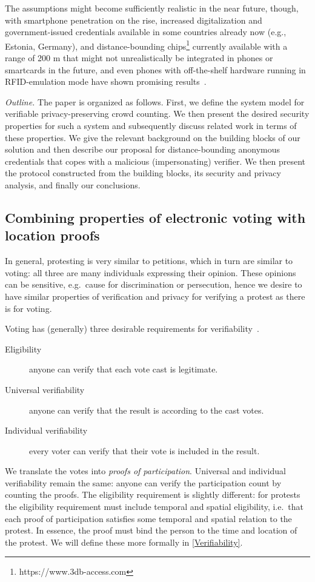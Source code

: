 The assumptions might
become sufficiently realistic in the near future, though, with
smartphone penetration on the rise, increased digitalization and government-issued credentials
available in some countries already now (e.g., Estonia, Germany), and
distance-bounding chips\footnote{ https://www.3db-access.com } currently available with a range of 200 m that
might not unrealistically be integrated in phones or smartcards in the
future, and even phones with off-the-shelf hardware running in
RFID-emulation mode have shown
promising results~\cite{dbonsmartphones}.

\emph{Outline.} The paper is organized as follows. 
First, we define the system model for verifiable privacy-preserving crowd counting.  We then
present the desired security properties for such a system and subsequently discuss related
work in terms of these properties. We give the relevant background on
the building blocks of our solution and then describe our proposal for
distance-bounding anonymous credentials that copes with a malicious
(impersonating) verifier. We then present the protocol constructed
from the building blocks, its security and privacy analysis, and
finally our conclusions. 

\subsection{Combining properties of electronic voting with location proofs}

In general, protesting is very similar to petitions, which in turn are similar 
to voting: all three are many individuals expressing their opinion.
These opinions can be sensitive, e.g.\ cause for discrimination or persecution, 
hence we desire to have similar properties of verification and privacy for 
verifying a protest as there is for voting.

Voting has (generally) three desirable requirements for 
verifiability~\cite{VerifyingPrivacyPropertiesOfVotingProtocols}.
\begin{description}
  \item[Eligibility] anyone can verify that each vote cast is legitimate.
  \item[Universal verifiability] anyone can verify that the result is according 
    to the cast votes.
  \item[Individual verifiability] every voter can verify that their vote is 
    included in the result.
\end{description}
We translate the votes into \emph{proofs of participation}.
Universal and individual verifiability remain the same: anyone can verify the 
participation count by counting the proofs.
The eligibility requirement is slightly different:
for protests the eligibility requirement must include temporal and spatial 
eligibility, i.e.\ that each proof of participation satisfies some temporal and 
spatial relation to the protest.
In essence, the proof must bind the person to the time and location of the 
protest.
We will define these more formally in \cref{Verifiability}.

